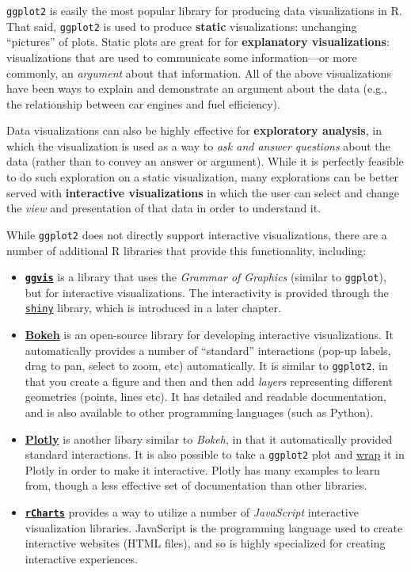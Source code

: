 \documentclass[]{book}
\theoremstyle{definition}
\theoremstyle{definition}
\theoremstyle{remark}
\begin{document}
\texttt{ggplot2} is easily the most popular library for producing data
visualizations in R. That said, \texttt{ggplot2} is used to produce
\textbf{static} visualizations: unchanging ``pictures'' of plots. Static
plots are great for for \textbf{explanatory visualizations}:
visualizations that are used to communicate some information---or more
commonly, an \emph{argument} about that information. All of the above
visualizations have been ways to explain and demonstrate an argument
about the data (e.g., the relationship between car engines and fuel
efficiency).

Data visualizations can also be highly effective for \textbf{exploratory
analysis}, in which the visualization is used as a way to \emph{ask and
answer questions} about the data (rather than to convey an answer or
argument). While it is perfectly feasible to do such exploration on a
static visualization, many explorations can be better served with
\textbf{interactive visualizations} in which the user can select and
change the \emph{view} and presentation of that data in order to
understand it.

While \texttt{ggplot2} does not directly support interactive
visualizations, there are a number of additional R libraries that
provide this functionality, including:

\begin{itemize}
\item
  \href{http://ggvis.rstudio.com/}{\textbf{\texttt{ggvis}}} is a library
  that uses the \emph{Grammar of Graphics} (similar to \texttt{ggplot}),
  but for interactive visualizations. The interactivity is provided
  through the \href{http://www.rstudio.com/shiny/}{\texttt{shiny}}
  library, which is introduced in a later chapter.
\item
  \href{http://hafen.github.io/rbokeh/index.html}{\textbf{Bokeh}} is an
  open-source library for developing interactive visualizations. It
  automatically provides a number of ``standard'' interactions (pop-up
  labels, drag to pan, select to zoom, etc) automatically. It is similar
  to \texttt{ggplot2}, in that you create a figure and then and then add
  \emph{layers} representing different geometries (points, lines etc).
  It has detailed and readable documentation, and is also available to
  other programming languages (such as Python).
\item
  \href{https://plot.ly/r/}{\textbf{Plotly}} is another libary similar
  to \emph{Bokeh}, in that it automatically provided standard
  interactions. It is also possible to take a \texttt{ggplot2} plot and
  \href{https://plot.ly/ggplot2/}{wrap} it in Plotly in order to make it
  interactive. Plotly has many examples to learn from, though a less
  effective set of documentation than other libraries.
\item
  \href{http://rdatascience.io/rCharts/}{\textbf{\texttt{rCharts}}}
  provides a way to utilize a number of \emph{JavaScript} interactive
  visualization libraries. JavaScript is the programming language used
  to create interactive websites (HTML files), and so is highly
  specialized for creating interactive experiences.
\end{itemize}
\end{document}
